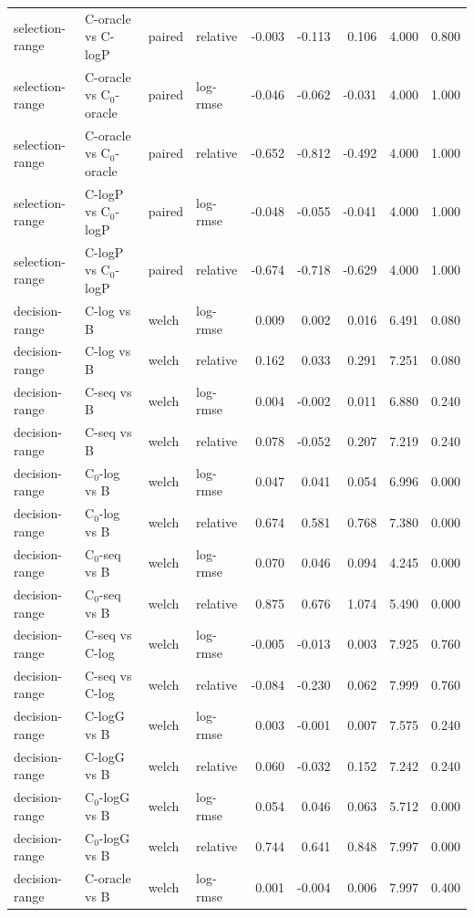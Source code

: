 \begin{longtable}{llllrrrrr}
selection-range & C-oracle vs C-logP & paired & relative & -0.003 & -0.113 & 0.106 & 4.000 & 0.800 \\
selection-range & C-oracle vs C$_0$-oracle & paired & log-rmse & -0.046 & -0.062 & -0.031 & 4.000 & 1.000 \\
selection-range & C-oracle vs C$_0$-oracle & paired & relative & -0.652 & -0.812 & -0.492 & 4.000 & 1.000 \\
selection-range & C-logP vs C$_0$-logP & paired & log-rmse & -0.048 & -0.055 & -0.041 & 4.000 & 1.000 \\
selection-range & C-logP vs C$_0$-logP & paired & relative & -0.674 & -0.718 & -0.629 & 4.000 & 1.000 \\
decision-range & C-log vs B & welch & log-rmse & 0.009 & 0.002 & 0.016 & 6.491 & 0.080 \\
decision-range & C-log vs B & welch & relative & 0.162 & 0.033 & 0.291 & 7.251 & 0.080 \\
decision-range & C-seq vs B & welch & log-rmse & 0.004 & -0.002 & 0.011 & 6.880 & 0.240 \\
decision-range & C-seq vs B & welch & relative & 0.078 & -0.052 & 0.207 & 7.219 & 0.240 \\
decision-range & C$_0$-log vs B & welch & log-rmse & 0.047 & 0.041 & 0.054 & 6.996 & 0.000 \\
decision-range & C$_0$-log vs B & welch & relative & 0.674 & 0.581 & 0.768 & 7.380 & 0.000 \\
decision-range & C$_0$-seq vs B & welch & log-rmse & 0.070 & 0.046 & 0.094 & 4.245 & 0.000 \\
decision-range & C$_0$-seq vs B & welch & relative & 0.875 & 0.676 & 1.074 & 5.490 & 0.000 \\
decision-range & C-seq vs C-log & welch & log-rmse & -0.005 & -0.013 & 0.003 & 7.925 & 0.760 \\
decision-range & C-seq vs C-log & welch & relative & -0.084 & -0.230 & 0.062 & 7.999 & 0.760 \\
decision-range & C-logG vs B & welch & log-rmse & 0.003 & -0.001 & 0.007 & 7.575 & 0.240 \\
decision-range & C-logG vs B & welch & relative & 0.060 & -0.032 & 0.152 & 7.242 & 0.240 \\
decision-range & C$_0$-logG vs B & welch & log-rmse & 0.054 & 0.046 & 0.063 & 5.712 & 0.000 \\
decision-range & C$_0$-logG vs B & welch & relative & 0.744 & 0.641 & 0.848 & 7.997 & 0.000 \\
decision-range & C-oracle vs B & welch & log-rmse & 0.001 & -0.004 & 0.006 & 7.997 & 0.400 \\

\end{longtable}
